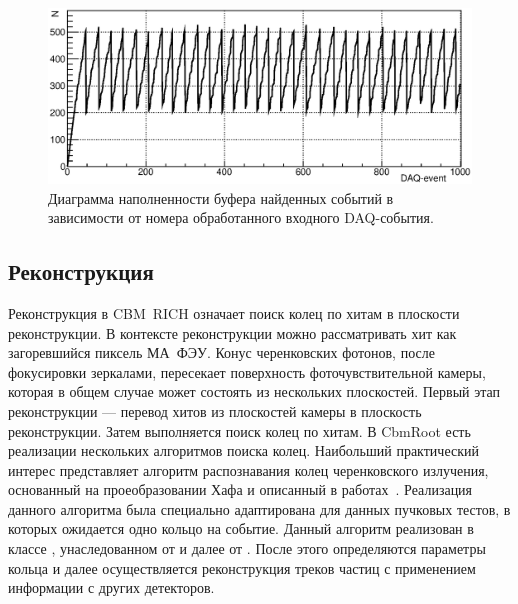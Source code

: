 \begin{figure}[H]
\centering
\includegraphics[width=1.0\textwidth]{pictures/16_Buff.eps}
\caption{Диаграмма наполненности буфера найденных событий в зависимости от номера обработанного входного DAQ-события.}
\label{fig:Buffer}
\end{figure}

\subsection{Реконструкция}\label{sec:secReconstruction}

Реконструкция в CBM~RICH означает поиск колец по хитам в плоскости реконструкции. В контексте реконструкции можно рассматривать хит как загоревшийся пиксель МА~ФЭУ. Конус черенковских фотонов, после фокусировки зеркалами, пересекает поверхность фоточувствительной камеры, которая в общем случае может состоять из нескольких плоскостей. Первый этап реконструкции --- перевод хитов из плоскостей камеры в плоскость реконструкции. Затем выполняется поиск колец по хитам. В CbmRoot есть реализации нескольких алгоритмов поиска колец. Наибольший практический интерес представляет алгоритм распознавания колец черенковского излучения, основанный на проеобразовании Хафа и описанный в работах~\cite{RECOPEPAN, RECO2}. Реализация данного алгоритма была специально адаптирована для данных пучковых тестов, в которых ожидается одно кольцо на событие. Данный алгоритм реализован в классе , унаследованном от  и далее от . После этого определяются параметры кольца и далее осуществляется реконструкция треков частиц с применением информации с других детекторов.

